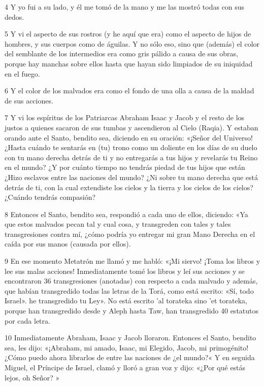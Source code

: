 \par 4 Y yo fui a su lado, y él me tomó de la mano y me las mostró todas con sus dedos.

\par 5 Y vi el aspecto de sus rostros (y he aquí que era) como el aspecto de hijos de hombres, y sus cuerpos como de águilas. Y no sólo eso, sino que (además) el color del semblante de los intermedios era como gris pálido a causa de sus obras, porque hay manchas sobre ellos hasta que hayan sido limpiados de su iniquidad en el fuego.

\par 6 Y el color de los malvados era como el fondo de una olla a causa de la maldad de sus acciones.

\par 7 Y vi los espíritus de los Patriarcas Abraham Isaac y Jacob y el resto de los justos a quienes sacaron de sus tumbas y ascendieron al Cielo (Raqia). Y estaban orando ante el Santo, bendito sea, diciendo en su oración: «¡Señor del Universo! ¿Hasta cuándo te sentarás en (tu) trono como un doliente en los días de su duelo con tu mano derecha detrás de ti y no entregarás a tus hijos y revelarás tu Reino en el mundo? ¿Y por cuánto tiempo no tendrás piedad de tus hijos que están ¿Hizo esclavos entre las naciones del mundo? ¿Ni sobre tu mano derecha que está detrás de ti, con la cual extendiste los cielos y la tierra y los cielos de los cielos? ¿Cuándo tendrás compasión?

\par 8 Entonces el Santo, bendito sea, respondió a cada uno de ellos, diciendo: «Ya que estos malvados pecan tal y cual cosa, y transgreden con tales y tales transgresiones contra mí, ¿cómo podría yo entregar mi gran Mano Derecha en el caída por sus manos (causada por ellos).

\par 9 En ese momento Metatrón me llamó y me habló: «¡Mi siervo! ¡Toma los libros y lee sus malas acciones! Inmediatamente tomé los libros y leí sus acciones y se encontraron 36 transgresiones (anotadas) con respecto a cada malvado y además, que habían transgredido todas las letras de la Torá, como está escrito: «Sí, todo Israel». he transgredido tu Ley». No está escrito 'al torateka sino 'et torateka, porque han transgredido desde y Aleph hasta Taw, han transgredido 40 estatutos por cada letra.

\par 10 Inmediatamente Abraham, Isaac y Jacob lloraron. Entonces el Santo, bendito sea, les dijo: «¡Abraham, mi amado, Isaac, mi Elegido, Jacob, mi primogénito! ¿Cómo puedo ahora librarlos de entre las naciones de ¿el mundo?« Y en seguida Miguel, el Príncipe de Israel, clamó y lloró a gran voz y dijo: «¿Por qué estás lejos, oh Señor? »


